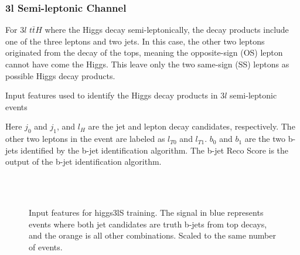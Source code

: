 
\subsubsection{3l Semi-leptonic Channel}
\label{subsec:higgs3lS}

For $3l$  $t\bar{t}H$ where the Higgs decay semi-leptonically, the decay products include one of the three leptons and two jets. In this case, the other two leptons originated from the decay of the tops, meaning the opposite-sign (OS) lepton cannot have come the Higgs. This leave only the two same-sign (SS) leptons as possible Higgs decay products. 

\begin{table}[H]

  \caption{Input features used to identify the Higgs decay products in $3l$  semi-leptonic events}
  \label{tab:higgsTop3lSfeatures}
\end{table}

Here $j_0$ and $j_1$, and $l_H$ are the jet and lepton decay candidates, respectively. The other two leptons in the event are labeled as $l_{T0}$ and $l_{T1}$. $b_0$ and $b_1$ are the two b-jets identified by the b-jet identification algorithm. The b-jet Reco Score is the output of the b-jet identification algorithm. 

\begin{figure}[H]
    \centering
    \\
    \\
    \caption{Input features for higgs3lS training. The signal in blue represents events where both jet candidates are truth b-jets from top decays, and the orange is all other combinations. Scaled to the same number of events.}
    \label{fig:features_higgs3lS}
\end{figure}

